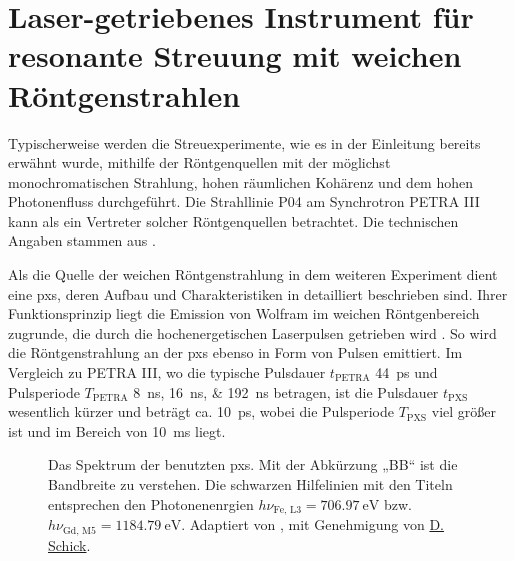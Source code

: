 \chapter{Laser-getriebenes Instrument für resonante Streuung mit weichen Röntgenstrahlen}
\label{text:quelle_roentgen}
Typischerweise werden die Streuexperimente, wie es in der Einleitung bereits erwähnt wurde, mithilfe der Röntgenquellen mit der möglichst monochromatischen Strahlung, hohen räumlichen Kohärenz und dem hohen Photonenfluss durchgeführt. Die Strahllinie P04 am Synchrotron PETRA III kann als ein Vertreter solcher Röntgenquellen betrachtet. Die technischen Angaben stammen aus \cite{viefhaus_variable_2013}.

\noindent
Als die Quelle der weichen Röntgenstrahlung in dem weiteren Experiment dient eine \gls{pxs}, deren Aufbau und Charakteristiken in \cite{schick_laser-driven_2021} detailliert beschrieben sind. Ihrer Funktionsprinzip liegt die Emission von Wolfram im weichen Röntgenbereich zugrunde, die durch die hochenergetischen Laserpulsen getrieben wird \cite{mantouvalou_high_2015}. So wird die Röntgenstrahlung an der \gls{pxs} ebenso in Form von Pulsen emittiert. Im Vergleich zu PETRA III, wo die typische Pulsdauer $t_\text{PETRA}$ \SI{44}{\pico\second} und Pulsperiode $T_\text{PETRA}$ \qtylist{8;16;192}{\nano\second}  betragen, ist die Pulsdauer $t_\text{PXS}$ wesentlich kürzer und beträgt ca. \SI{10}{\pico\second}, wobei die Pulsperiode $T_\text{PXS}$ viel größer ist und im Bereich von \SI{10}{\milli\second} liegt.
\begin{figure}[H]
    \centering
    
    \caption{Das Spektrum der benutzten \gls{pxs}. Mit der Abkürzung „BB“ ist die Bandbreite zu verstehen. Die schwarzen Hilfelinien mit den Titeln entsprechen den Photonenenrgien $h\nu_{\text{Fe, L3}} = \SI{706.97}{\eV}$ bzw. $h\nu_{\text{Gd, M5}} = \SI{1184,79}{\eV}$. Adaptiert von \cite{schick_laser-driven_2021}, mit Genehmigung von \href{https://orcid.org/0000-0001-7988-6489}{D. Schick}.}
    \label{fig:pxs_spectrum}
\end{figure}

